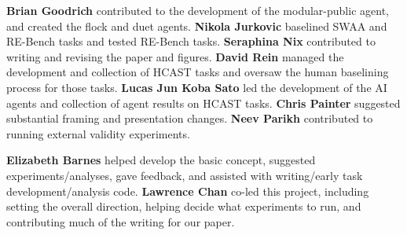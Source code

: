 \documentclass{article}
\newcommand{\gabenchmark}{HCAST}
\begin{document}
\textbf{Brian Goodrich} contributed to the development of the modular-public agent, and created the flock and duet agents. \textbf{Nikola Jurkovic} baselined SWAA and RE-Bench tasks and tested RE-Bench tasks. \textbf{Seraphina Nix} contributed to writing and revising the paper and figures. \textbf{David Rein} managed the development and collection of \gabenchmark{} tasks and oversaw the human baselining process for those tasks. \textbf{Lucas Jun Koba Sato} led the development of the AI agents and collection of agent results on \gabenchmark{} tasks. \textbf{Chris Painter} suggested substantial framing and presentation changes. \textbf{Neev Parikh} contributed to running external validity experiments.

\textbf{Elizabeth Barnes} helped develop the basic concept, suggested experiments/analyses, gave feedback, and assisted with writing/early task development/analysis code. \textbf{Lawrence Chan} co-led this project, including setting the overall direction, helping decide what experiments to run, and contributing much of the writing for our paper. %
\end{document}
